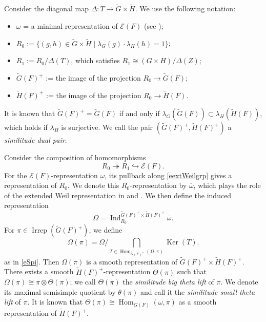 \documentclass[11pt]{article}
\theoremstyle{plain}
\theoremstyle{remark}
\theoremstyle{definition}
\DeclareMathOperator{\Ker}{Ker}
\DeclareMathOperator{\Hom}{Hom}
\DeclareMathOperator{\Ind}{Ind}
\DeclareMathOperator{\irr}{Irrep}
\begin{document}
Consider the diagonal map $\Delta\colon T\to \widetilde{G}\times \widetilde{H}$.
We use the following notation:
\begin{itemize}
\item $\omega$ = a minimal representation of $\mathcal{E}(F)$ (see \cite{GanSav2005});
\item $R_0:=\{(g,h)\in \widetilde{G}\times \widetilde{H}\mid\lambda_{G}(g)\cdot \lambda_{H}(h)=1\}$;
\item $R_1:=R_0/\Delta(T)$, which satisfies $R_1\cong (G\times H)/\Delta(Z)$;
\item $\widetilde{G}(F)^+$ := the image of the projection $R_0\to \widetilde{G}(F)$;
\item $\widetilde{H}(F)^+$ := the image of the projection $R_0\to \widetilde{H}(F)$.
\end{itemize}
It is known that $\widetilde{G}(F)^+=\widetilde{G}(F)$ if and only if $\lambda_G(\widetilde{G}(F))\subset \lambda_H(\widetilde{H}(F))$, which holds if $\lambda_H$ is surjective.
We call the pair $(\widetilde{G}(F)^+,\widetilde{H}(F)^+)$ a \emph{similitude dual pair}.

Consider the composition of homomorphisms
\begin{equation}\label{eextWeilgrp}
    R_0\twoheadrightarrow R_1 \hookrightarrow \mathcal{E}(F).
\end{equation}
For the $\mathcal{E}(F)$-representation $\omega$, its pullback along \eqref{eextWeilgrp} gives a representation of $R_0$.
We denote this $R_0$-representation by $\overline{\omega}$, which plays the role of the extended Weil representation in \cite[Section~3]{RobertBrooks1996} and \cite[Section~3]{GanTan2014}.
We then define the induced representation
\begin{equation}\label{eindWeil}
    \Omega=\Ind_{R_0}^{\widetilde{G}(F)^{+}\times\widetilde{H}(F)^{+}}\overline{\omega}.
\end{equation}
For $\pi\in \irr(\widetilde{G}(F)^{+})$, we define
\[
\Omega(\pi)=\Omega\Big/\bigcap\limits_{T\in \Hom_{\widetilde{G}(F)^+}(\Omega,\pi)}\Ker(T).
\]
as in \eqref{eSpi}. 
Then $\Omega(\pi)$ is a smooth representation of $\widetilde{G}(F)^{+}\times\widetilde{H}(F)^{+}$.
There exists a smooth $\widetilde{H}(F)^+$-representation $\Theta(\pi)$ such that $\Omega(\pi)\cong \pi\otimes\Theta(\pi)$; we call $\Theta(\pi)$ the \emph{similitude big theta lift} of $\pi$.
We denote its maximal semisimple quotient by $\theta(\pi)$ and call it the \emph{similitude small theta lift} of $\pi$.
It is known that $\Theta(\pi)\cong \Hom_{G(F)}(\omega,\pi)$ as a smooth representation of $\widetilde{H}(F)^{+}$.
\end{document}
